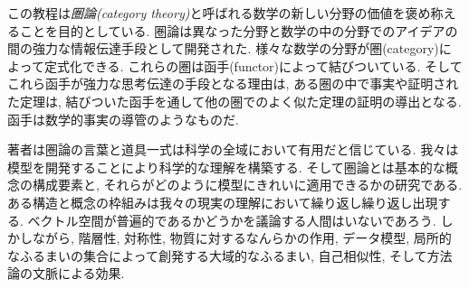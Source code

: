 
この教程は\emph{圏論(category theory)}と呼ばれる数学の新しい分野の価値を褒め称えることを目的としている. 圏論は異なった分野と数学の中の分野でのアイデアの間の強力な情報伝達手段として開発された. 様々な数学の分野が圏(category)によって定式化できる. これらの圏は函手(functor)によって結びついている. そしてこれら函手が強力な思考伝達の手段となる理由は, ある圏の中で事実や証明された定理は, 結びついた函手を通して他の圏でのよく似た定理の証明の導出となる. 函手は数学的事実の導管のようなものだ.


著者は圏論の言葉と道具一式は科学の全域において有用だと信じている. 我々は模型を開発することにより科学的な理解を構築する. そして圏論とは基本的な概念の構成要素と, それらがどのように模型にきれいに適用できるかの研究である. ある構造と概念の枠組みは我々の現実の理解において繰り返し繰り返し出現する. ベクトル空間が普遍的であるかどうかを議論する人間はいないであろう. しかしながら, 階層性, 対称性, 物質に対するなんらかの作用, データ模型, 局所的なふるまいの集合によって創発する大域的なふるまい, 自己相似性, そして方法論の文脈による効果.


